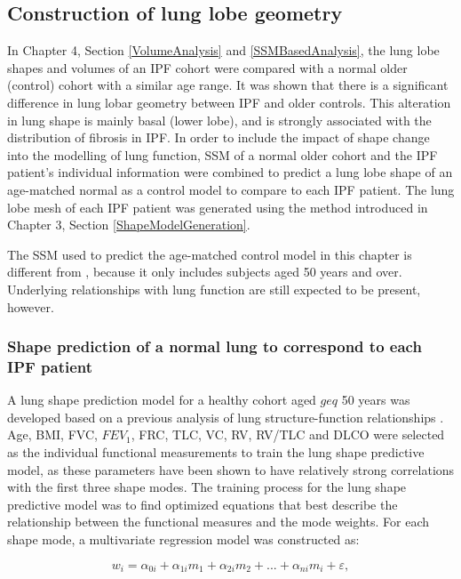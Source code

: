 \subsection{Construction of lung lobe geometry}
In Chapter 4, Section \ref{VolumeAnalysis} and \ref{SSMBasedAnalysis}, the lung lobe shapes and volumes of an IPF cohort were compared with a normal older (control) cohort with a similar age range. It was shown that there is a significant difference in lung lobar geometry between IPF and older controls. This alteration in lung shape is mainly basal (lower lobe), and is strongly associated with the distribution of fibrosis in IPF. In order to include the impact of shape change into the modelling of lung function, SSM of a normal older cohort and the IPF patient's individual information were combined to predict a lung lobe shape of an age-matched normal as a control model to compare to each IPF patient. The lung lobe mesh of each IPF patient was generated using the method introduced in Chapter 3, Section \ref{ShapeModelGeneration}.

The SSM used to predict the age-matched control model in this chapter is different from \cite{Osanlouy2018Statistical}, because it only includes subjects aged 50 years and over. Underlying relationships with lung function are still expected to be present, however.

\subsubsection{Shape prediction of a normal lung to correspond to each IPF patient}
A lung shape prediction model for a healthy cohort aged $geq$ 50 years was developed based on a previous analysis of lung structure-function relationships \citep{Osanlouy2018Statistical}. Age, BMI, FVC, $FEV_1$, FRC, TLC, VC, RV, RV/TLC and DLCO were selected as the individual functional measurements to train the lung shape predictive model, as these parameters have been shown to have relatively strong correlations with the first three shape modes. The training process for the lung shape predictive model was to find optimized equations that best describe the relationship between the functional measures and the mode weights. For each shape mode, a multivariate regression model was constructed as:

\begin{equation}
 \label{eq:MultivariateRegression}
 w_i = \alpha_{0i} + \alpha_{1i}m_1 + \alpha_{2i}m_2 + ... + \alpha_{ni}m_i + \varepsilon,
\end{equation}

